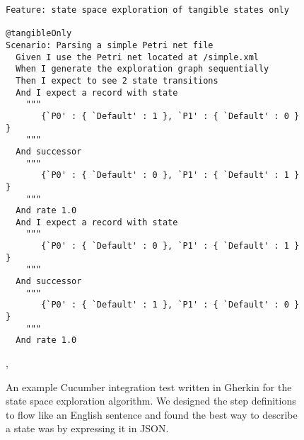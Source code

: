\begin{figure}
\begin{lstlisting}[language=Cucumber,
                   frame=single, 
                  ]
Feature: state space exploration of tangible states only

@tangibleOnly
Scenario: Parsing a simple Petri net file
  Given I use the Petri net located at /simple.xml
  When I generate the exploration graph sequentially
  Then I expect to see 2 state transitions
  And I expect a record with state
    """
       {`P0' : { `Default' : 1 }, `P1' : { `Default' : 0 } }
    """
  And successor
    """
       {`P0' : { `Default' : 0 }, `P1' : { `Default' : 1 } }
    """
  And rate 1.0
  And I expect a record with state
    """
       {`P0' : { `Default' : 0 }, `P1' : { `Default' : 1 } }
    """
  And successor
    """
       {`P0' : { `Default' : 1 }, `P1' : { `Default' : 0 } }
    """
  And rate 1.0

\end{lstlisting}
\caption{An example Cucumber integration test written in Gherkin for the state space exploration algorithm. We designed the step definitions to flow like an English sentence and found the best way to describe a state was by expressing it in JSON.}, 
\label{lst:cucumber_state_space}
\end{figure}
